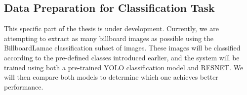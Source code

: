 \subsection{Data Preparation for Classification Task}\label{sec:preprocessingclassification}

This specific part of the thesis is under development. Currently, we are attempting to extract as many billboard images as possible using the BillboardLamac classification subset of images. These images will be classified according to the pre-defined classes introduced earlier, and the system will be trained using both a pre-trained YOLO classification model and RESNET. We will then compare both models to determine which one achieves better performance.